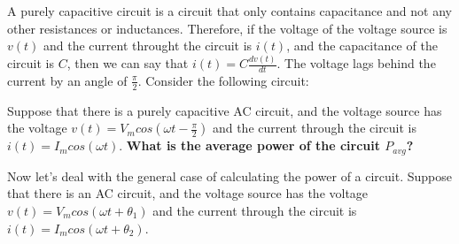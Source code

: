 A purely capacitive circuit is a circuit that only contains capacitance and not any other resistances or inductances. Therefore, if the voltage of the voltage source
is $v(t)$ and the current throught the circuit is $i(t)$, and the capacitance of the circuit is $C$, then we can say that $i(t)=C\frac{dv(t)}{dt}$. The voltage lags behind the current
by an angle of $\frac{\pi}{2}$.
Consider the following circuit:

\begin{enumerate}[resume]

\qitem Suppose that there is a purely capacitive AC circuit, and the voltage source has the voltage $v(t)=V_mcos(\omega t-\frac{\pi}{2})$ and the current through
the circuit is $i(t)=I_mcos(\omega t)$. \textbf{What is the average power of the circuit $P_{avg}$?} 

\ws{\vspace{80px}}


\end{enumerate}

Now let's deal with the general case of calculating the power of a circuit. Suppose that there is an AC circuit, and the voltage source has the voltage $v(t)=V_mcos(\omega t+{\theta}_1)$ and the current through
the circuit is $i(t)=I_mcos(\omega t + {\theta}_2)$. 

